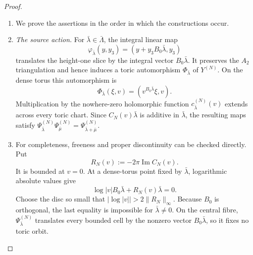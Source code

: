 \begin{proof}
\begin{enumerate}[label=\arabic*.,leftmargin=*]
\item We prove the assertions in the order in which the constructions occur.

\item \medskip\noindent
\emph{The source action.}
For $\bar\lambda\in\bar\Lambda$, the integral linear map
\[
 \varphi_{\bar\lambda}(y,y_3)
 =(y+y_3B_0\bar\lambda,y_3)
\]
translates the height-one slice by the integral vector
$B_0\bar\lambda$.  It preserves the $A_2$ triangulation and hence induces
a toric automorphism $\Phi_{\bar\lambda}$ of $Y^{(N)}$.  On the dense
torus this automorphism is
\[
 \Phi_{\bar\lambda}(\xi,v)
 =(v^{B_0\bar\lambda}\xi,v).
\]
Multiplication by the nowhere-zero holomorphic function
$c^{(N)}_{\bar\lambda}(v)$ extends across every toric chart.  Since
$C_N(v)\bar\lambda$ is additive in $\bar\lambda$, the resulting maps
satisfy
$\Psi^{(N)}_{\bar\lambda}\Psi^{(N)}_{\bar\mu}
=\Psi^{(N)}_{\bar\lambda+\bar\mu}$.

\item For completeness, freeness and proper discontinuity can be checked
directly.  Put
\[
 R_N(v):=-2\pi\operatorname{Im}C_N(v).
\]
It is bounded at $v=0$.  At a dense-torus point fixed by
$\bar\lambda$, logarithmic absolute values give
\[
 \log|v|B_0\bar\lambda+R_N(v)\bar\lambda=0.
\]
Choose the disc so small that
$|\log|v||>2\|R_N\|_\infty$.  Because $B_0$ is orthogonal, the last
equality is impossible for $\bar\lambda\ne0$.  On the central fibre,
$\Psi^{(N)}_{\bar\lambda}$ translates every bounded cell by the nonzero
vector $B_0\bar\lambda$, so it fixes no toric orbit.


\end{enumerate}
\end{proof}
